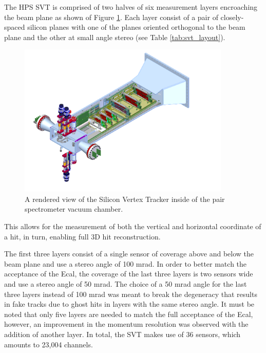 The HPS SVT is comprised of two halves of six measurement layers encroaching the
beam plane as shown of Figure \ref{fig:svt_layout_render}. Each layer consist of a pair of
closely-spaced silicon planes with one of the planes oriented orthogonal to
the beam plane and the other at small angle stereo 
(see Table \ref{tab:svt_layout}).
\begin{figure}[h!t]
    \centering
    \includegraphics[width=0.9\textwidth]{images/svt_layout_render.png}
    \caption{A rendered view of the Silicon Vertex Tracker inside of the pair
             spectrometer vacuum chamber.}
    \label{fig:svt_layout_render}
\end{figure}
This allows
for the measurement of both the vertical and horizontal coordinate of a hit, in turn, 
enabling full 3D hit reconstruction.  

The first three layers consist of a single sensor of coverage above and below
the beam plane and use a stereo angle of 100 mrad. In order to better match the
acceptance of the Ecal, the coverage of the last three layers is two sensors 
wide and use a stereo angle of 50 mrad.  The choice of a 50 mrad angle for the
last three layers instead of 100 mrad was meant to break the degeneracy that
results in fake tracks
due to ghost hits in layers with the same stereo angle.  It must be noted that
only five layers are needed to match the full acceptance of the Ecal, however,
an improvement in the momentum resolution was observed with the addition of 
another layer.  In total, the SVT makes use of 36 sensors, which amounts to 
23,004 channels.

